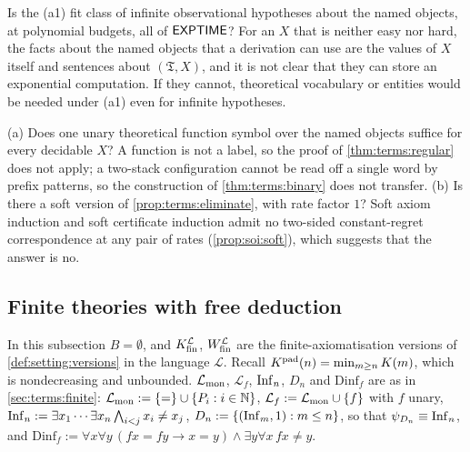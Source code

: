 \begin{question}\label{q:terms:a1}
Is the (a1) fit class of infinite observational hypotheses about the named objects, at polynomial budgets, all of $\mathsf{EXPTIME}$? For an $X$ that is neither easy nor hard, the facts about the named objects that a derivation can use are the values of $X$ itself and sentences about $(\mathfrak T,X)$, and it is not clear that they can store an exponential computation. If they cannot, theoretical vocabulary or entities would be needed under (a1) even for infinite hypotheses.
\end{question}

\begin{question}\label{q:terms:unaryfunction}
(a) Does one unary theoretical function symbol over the named objects suffice for every decidable $X$? A function is not a label, so the proof of \cref{thm:terms:regular} does not apply; a two-stack configuration cannot be read off a single word by prefix patterns, so the construction of \cref{thm:terms:binary} does not transfer. (b) Is there a soft version of \cref{prop:terms:eliminate}, with rate factor $1$? Soft axiom induction and soft certificate induction admit no two-sided constant-regret correspondence at any pair of rates (\cref{prop:soi:soft}), which suggests that the answer is no.
\end{question}

\subsection{Finite theories with free deduction}\label{app:terms:finite}

In this subsection $B=\emptyset$, and $K_{\mathrm{fin}}^{\mathcal L}$, $W_{\mathrm{fin}}^{\mathcal L}$ are the finite-axiomatisation versions of \cref{def:setting:versions} in the language $\mathcal L$. Recall $K^{\mathrm{pad}}(n)=\min_{m\ge n}K(m)$, which is nondecreasing and unbounded. $\mathcal L_{\rm mon}$, $\mathcal L_f$, $\mathrm{Inf}_{n}$, $D_n$ and $\mathrm{Dinf}_f$ are as in \cref{sec:terms:finite}: $\mathcal L_{\rm mon}:=\{=\}\cup\{P_i:i\in\mathbb N\}$, $\mathcal L_f:=\mathcal L_{\rm mon}\cup\{f\}$ with $f$ unary, $\mathrm{Inf}_{n}:=\exists x_1\cdots\exists x_n\bigwedge_{i<j}x_i\ne x_j$, $D_n:=\{(\mathrm{Inf}_{m},1):m\le n\}$, so that $\psi_{D_n}\equiv\mathrm{Inf}_{n}$, and $\mathrm{Dinf}_f:=\forall x\forall y\,(fx=fy\to x=y)\wedge\exists y\forall x\,fx\ne y$.


